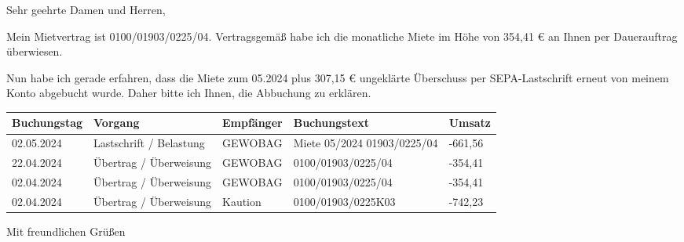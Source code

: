 \documentclass[fontsize=11pt,version=last,ngerman,parskip]{scrlttr2}
\begin{document}
\begin{letter}{}
  \opening{Sehr geehrte Damen und Herren,} Mein Mietvertrag ist
  0100/01903/0225/04.  Vertragsgemäß habe ich die monatliche Miete im
  Höhe von 354,41 € an Ihnen per Dauerauftrag überwiesen.

  Nun habe ich gerade erfahren, dass die Miete zum 05.2024 plus 307,15 € ungeklärte Überschuss per SEPA-Lastschrift erneut von meinem Konto
  abgebucht wurde.  Daher bitte ich Ihnen, die Abbuchung zu erklären.
  \begin{center}
    \begin{tabular}{l | l | l | l | l}
      Buchungstag & Vorgang & Empfänger & Buchungstext & Umsatz      \\
      \hline
      02.05.2024 & Lastschrift / Belastung & GEWOBAG & Miete 05/2024
                                                       01903/0225/04     &
                                                                       -661,56      \\
      22.04.2024 & Übertrag / Überweisung & GEWOBAG &
                                                      0100/01903/0225/04
                                                       & -354,41 \\
      02.04.2024 & Übertrag / Überweisung & GEWOBAG &
                                                      0100/01903/0225/04
                                                       & -354,41 \\
      02.04.2024 & Übertrag / Überweisung & Kaution &
                                                      0100/01903/0225K03
                                                       & -742,23
    \end{tabular}
  \end{center}
\closing{Mit freundlichen Grüßen}
\end{letter}
\end{document}
